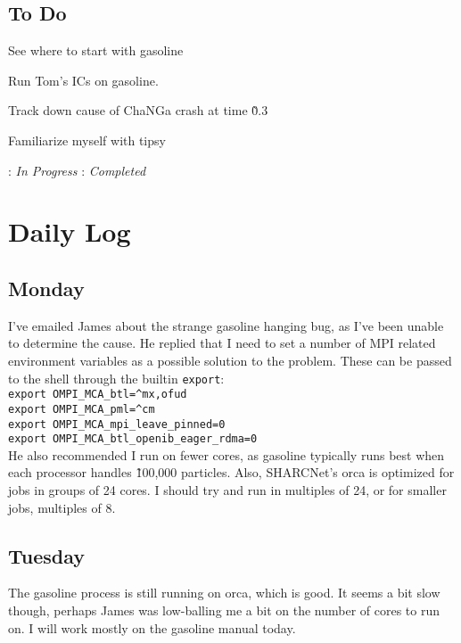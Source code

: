 \documentclass[11pt,letterpaper]{article}
\begin{document}
\subsection*{To Do}
\begin{bullets}
\item[\checkmark] See where to start with gasoline
\item[\textleaf] Run Tom's ICs on gasoline.
\item Track down cause of ChaNGa crash at time \~0.3
\item Familiarize myself with tipsy
\end{bullets}

\textleaf : \textit{In Progress} \qquad \checkmark : \textit{Completed}

\section*{Daily Log}
\subsection*{Monday}
I've emailed James about the strange gasoline hanging bug, as I've been unable
to determine the cause.  He replied that I need to set a number of MPI related
environment variables as a possible solution to the problem.  These can be
passed to the shell through the builtin \verb!export!:\\
\verb!export OMPI_MCA_btl=^mx,ofud!\\
\verb!export OMPI_MCA_pml=^cm!\\
\verb!export OMPI_MCA_mpi_leave_pinned=0!\\
\verb!export OMPI_MCA_btl_openib_eager_rdma=0!\\
He also recommended I run on fewer cores, as gasoline typically runs best when 
each processor handles \~100,000 particles.  Also, SHARCNet's orca is optimized
for jobs in groups of 24 cores. I should try and run in multiples of 24, or
for smaller jobs, multiples of 8.
\subsection*{Tuesday}
The gasoline process is still running on orca, which is good.  It seems a bit
slow though, perhaps James was low-balling me a bit on the number of cores
to run on.  I will work mostly on the gasoline manual today.
\end{document}
